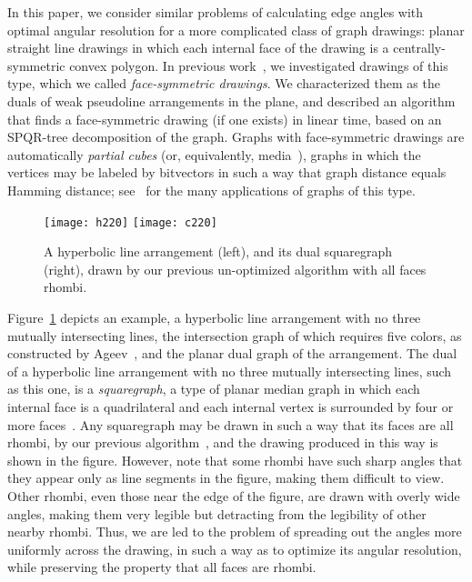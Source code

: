 \documentclass[11pt,letter]{article}
\begin{document}
In this paper, we consider similar problems of calculating edge angles
with optimal angular resolution for a more complicated class of graph
drawings: planar straight line drawings in which each internal face of
the drawing is a centrally-symmetric convex polygon. In previous
work~\cite{Epp-GD-04}, we investigated drawings of this type, which we called \emph{face-symmetric drawings}.  We characterized them as the duals of weak pseudoline arrangements in the
plane, and described an algorithm that finds a face-symmetric drawing
(if one exists) in linear time, based on an SPQR-tree decomposition of
the graph. Graphs with face-symmetric drawings are automatically
\emph{partial cubes} (or, equivalently, media~\cite{EppFalOvc-07}),
graphs in which the vertices may be labeled by bitvectors in such a
way that graph distance equals Hamming distance;
see~\cite{EppFalOvc-07} for the many applications of graphs of this
type.

\begin{figure}[t]
\centering
\texttt{[image: h220]}
\qquad
\texttt{[image: c220]}
\caption{A hyperbolic line arrangement (left), and its dual
squaregraph (right), drawn by our previous un-optimized algorithm with
all faces rhombi.}
\label{fig:old-220}
\end{figure}

Figure~\ref{fig:old-220} depicts an example, a hyperbolic line
arrangement with no three mutually intersecting lines, the
intersection graph of which requires five colors, as constructed by
Ageev~\cite{Age-DM-96}, and the planar dual graph of the arrangement.
The dual of a hyperbolic line arrangement with no three mutually
intersecting lines, such as this one, is a \emph{squaregraph}, a type
of planar median graph in which each internal face is a quadrilateral
and each internal vertex is surrounded by four or more
faces~\cite{CheDraVax-SODA-02, bendelt_chepoi_eppstein}. Any squaregraph may be
drawn in such a way that its faces are all rhombi, by our previous
algorithm~\cite{Epp-GD-04}, and the drawing produced in this way is
shown in the figure. However, note that some rhombi have such sharp
angles that they appear only as line segments in the figure, making
them difficult to view. Other rhombi, even those near the edge of the
figure, are drawn with overly wide angles, making them very legible
but detracting from the legibility of other nearby rhombi. Thus, we
are led to the problem of spreading out the angles more uniformly
across the drawing, in such a way as to optimize its angular
resolution, while preserving the property that all faces are rhombi.
\end{document}
